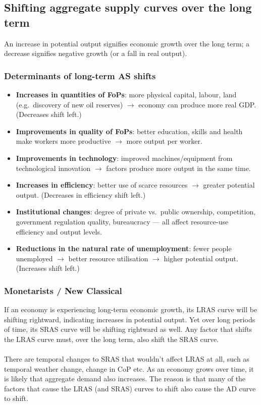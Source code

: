 \subsection{Shifting aggregate supply curves over the long term}
An increase in potential output signifies economic growth over the long term; a decrease signifies negative growth (or a fall in real output).
\subsubsection*{Determinants of long-term AS shifts}
\begin{itemize}
  \item \textbf{Increases in quantities of FoPs}: more physical capital, labour, land (e.g.\ discovery of new oil reserves) $\to$ economy can produce more real GDP. (Decreases shift left.)
  \item \textbf{Improvements in quality of FoPs}: better education, skills and health make workers more productive $\to$ more output per worker.
  \item \textbf{Improvements in technology}: improved machines/equipment from technological innovation $\to$ factors produce more output in the same time.
  \item \textbf{Increases in efficiency}: better use of scarce resources $\to$ greater potential output. (Decreases in efficiency shift left.)
  \item \textbf{Institutional changes}: degree of private vs.\ public ownership, competition, government regulation quality, bureaucracy --- all affect resource-use efficiency and output levels.
  \item \textbf{Reductions in the natural rate of unemployment}: fewer people unemployed $\to$ better resource utilisation $\to$ higher potential output. (Increases shift left.)
\end{itemize}
\subsubsection*{Monetarists / New Classical}
If an economy is experiencing long-term economic growth, its LRAS curve will be shifting rightward, indicating increases in potential output. Yet over long periods of
time, its SRAS curve will be shifting rightward as well. Any factor that shifts the LRAS curve must, over the long term, also shift the SRAS curve.\\\\
There are temporal changes to SRAS that wouldn't affect LRAS at all, such as temporal weather change, change in CoP etc. As an economy grows over time, it is likely that aggregate demand also increases. The reason is that many of the factors that cause the LRAS (and SRAS) curves to shift also cause the AD curve to shift.
